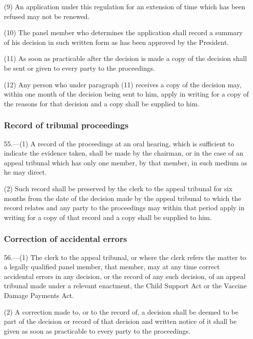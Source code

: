 \documentclass[12pt,a4paper]{article}
\begin{document}
(9) An application under this regulation for an extension of time which has been refused may not be renewed.

(10) The panel member who determines the application shall record a summary of his decision in such written form as has been approved by the President.

(11) As soon as practicable after the decision is made a copy of the decision shall be sent or given to every party to the proceedings.

(12) Any person who under paragraph (11) receives a copy of the decision may, within one month of the decision being sent to him, apply in writing for a copy of the reasons for that decision and a copy shall be supplied to him.

\subsubsection[55. Record of tribunal proceedings]{Record of tribunal proceedings}

55.—(1) A record of the proceedings at an oral hearing, which is sufficient to indicate the evidence taken, shall be made by the chairman, or in the case of an appeal tribunal which has only one member, by that member, in such medium as he may direct.

(2) Such record shall be preserved by the clerk to the appeal tribunal for six months from the date of the decision made by the appeal tribunal to which the record relates and any party to the proceedings may within that period apply in writing for a copy of that record and a copy shall be supplied to him.

\subsubsection[56. Correction of accidental errors]{Correction of accidental errors}

56.—(1) The clerk to the appeal tribunal, or where the clerk refers the matter to a legally qualified panel member, that member, may at any time correct accidental errors in any decision, or the record of any such decision, of an appeal tribunal made under a relevant enactment, the Child Support Act or the Vaccine Damage Payments Act.

(2) A correction made to, or to the record of, a decision shall be deemed to be part of the decision or record of that decision and written notice of it shall be given as soon as practicable to every party to the proceedings.
\end{document}

